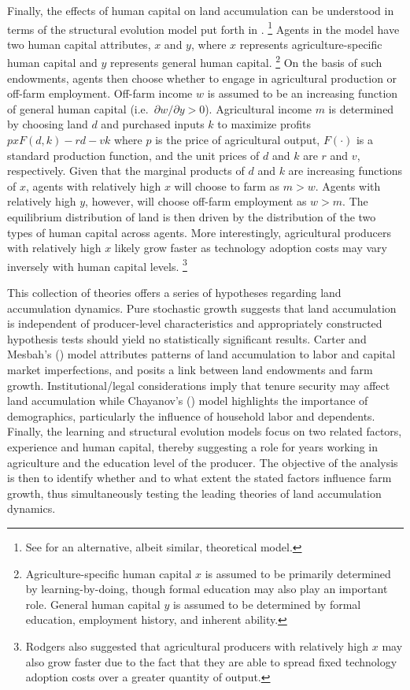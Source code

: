\documentclass[english]{article}
\begin{document}
Finally, the effects of human capital on land accumulation can be understood
in terms of the structural evolution model put forth in \citet{rodgers1994}.%
\footnote{See \citet{sumner1987} for an alternative, albeit similar, theoretical
model.}
Agents in the model have two human capital attributes, $x$ and $y$, where
$x$ represents agriculture-specific human capital and $y$ represents general 
human capital.%
\footnote{Agriculture-specific human capital $x$ is assumed to be primarily 
determined by learning-by-doing, though formal education may also play an 
important role. 
General human capital $y$ is assumed to be determined by formal education, 
employment history, and inherent ability.}
On the basis of such endowments, agents then choose whether to engage in 
agricultural production or off-farm employment.
Off-farm income $w$ is assumed to be an increasing function of general
human capital (i.e.\ $\partial w/ \partial y > 0$). 
Agricultural income $m$ is determined by choosing land $d$ and purchased 
inputs $k$ to maximize profits $p x F(d,k) - rd - vk$ where $p$ is the price 
of agricultural output, $F(\cdot)$ is a standard production function, 
and the unit prices of $d$ and $k$ are $r$ and $v$, respectively.
Given that the marginal products of $d$ and $k$ are increasing functions of 
$x$, agents with relatively high $x$ will choose to farm as $m > w$.
Agents with relatively high $y$, however, will choose off-farm employment
 as $w > m$.
The equilibrium distribution of land is then driven by the distribution of the 
two types of human capital across agents.
More interestingly, agricultural producers with relatively high $x$ likely 
grow faster as technology adoption costs may vary inversely with human 
capital levels.%
\footnote{Rodgers also suggested that agricultural producers with relatively 
high $x$ may also grow faster due to the fact that they are able to spread fixed 
technology adoption costs over a greater quantity of output.}

This collection of theories offers a series of hypotheses regarding land 
accumulation dynamics.
Pure stochastic growth suggests that land accumulation is independent of 
producer-level characteristics and appropriately constructed hypothesis tests
should yield no statistically significant results. 
Carter and Mesbah's (\citeyear{carter1993}) model attributes patterns of land 
accumulation to labor and capital market imperfections, and posits a link 
between land endowments and farm growth. 
Institutional/legal considerations imply that tenure security may affect land 
accumulation while Chayanov's (\citeyear{chayanov1966}) model highlights 
the importance of demographics, particularly the influence of household 
labor and dependents. 
Finally, the learning and structural evolution models focus on two related 
factors, experience and human capital, thereby suggesting a role for years 
working in agriculture and the education level of the producer. 
The objective of the analysis is then to identify whether and to what extent
the stated factors influence farm growth, thus simultaneously testing the 
leading theories of land accumulation dynamics.
\end{document}
